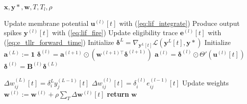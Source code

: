 \documentclass[10pt]{article} %
\begin{document}
    \begin{algorithm}[H]
    \caption{S-TLLR algorithm}\label{alg:s_tllr_forward}
    \begin{algorithmic}[1]
    \REQUIRE$\boldsymbol{x}, \boldsymbol{y*}, \boldsymbol{w}, T, T_l, \rho$
    
    \STATE Update membrane potential $\boldsymbol{u}^{(l)}[t]$ with (\ref{eq:lif_integrate})
    \STATE Produce output spikes $\boldsymbol{y}^{(l)}[t]$ with (\ref{eq:lif_fire})
    \STATE Update eligibility trace $\boldsymbol{e}^{(l)}[t]$ with (\ref{eq:e_tllr_forward_time})
    \ENDFOR
    \STATE Initialize $\boldsymbol{\delta}^{L} = \nabla_{\boldsymbol{y}^L[t]}\mathcal{L}(\boldsymbol{y}^L[t],\boldsymbol{y*})$
    \STATE Initialize $\boldsymbol{a}^{(L)}:=\boldsymbol{1}$
    \STATE $\boldsymbol{\delta}^{(l)} = \boldsymbol{a}^{(l+1)} \odot (\boldsymbol{w}^{(l+1)\top}\boldsymbol{\delta}^{(l+1)})$
    \STATE$ \boldsymbol{a}^{(l)} = \boldsymbol{\delta}^{(l)}\odot \Theta'(\boldsymbol{u}^{(l)}[t])$
    \STATE $\boldsymbol{\delta}^{(l)} = \boldsymbol{B}^{(l)}\boldsymbol{\delta}^{(L)}$
    \ENDIF
    \ENDFOR

    \STATE  $\Delta w_{ij}^{(L)}[t] = \delta_i^{L}y^{(L-1)}_j[t]$
    \STATE  $\Delta w_{ij}^{(l)}[t] = \delta_i^{(l)}e_{ij}^{(l-1)}[t]$
    \ENDIF
    \ENDFOR
    \STATE Update weights $\boldsymbol{w}^{(l)}:=\boldsymbol{w}^{(l)}+\rho\sum_T\Delta\boldsymbol{w}^{(l)}[t]$
    \ENDFOR
    \STATE \textbf{return} $\boldsymbol{w}$
    \end{algorithmic}
    \end{algorithm}
\end{document}
